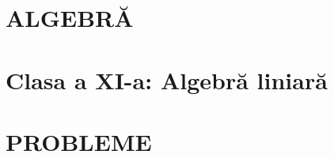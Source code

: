 

\renewcommand{\titluserie}{Algebră pentru Olimpiadă}
\renewcommand{\numarvolum}{3}
\renewcommand{\titluvolum}{clasa a XI-a}
\renewcommand{\subtitluvolum}{Polinoame, matrice, determinanți, rang, forma Jordan, spații vectoriale}
\renewcommand{\despreacestvolum}{Cuprinde algebra liniară de clasa a XI-a: polinoame, matrice, determinanți, rang, matrice bloc, forma Jordan și spații vectoriale.}
\renewcommand{\celelaltevolume}{analizei de clasa a XI-a, analizei de clasa a XII-a și algebrei abstracte}





\clearpage\color{ink}
\part{ALGEBRĂ}

\part{Clasa a XI-a: Algebră liniară}


\clearpage
\part{PROBLEME}
\lhead{\small\textcolor{grey}{Probleme de algebră}}
\nopagebreak
{}





